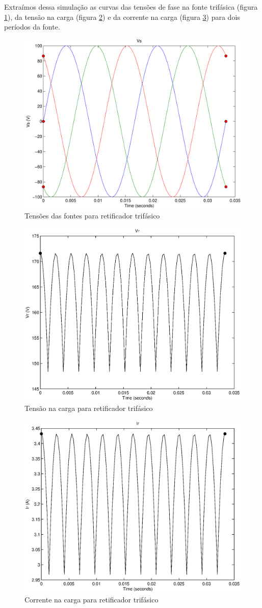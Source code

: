 \documentclass{report}
\begin{document}
{{Extraímos dessa simulação as curvas das tensões de fase na fonte trifásica (figura \ref{fig:tvs}), da tensão na carga (figura \ref{fig:tvr}) e da corrente na carga (figura \ref{fig:tir}) para dois períodos da fonte.
\begin{figure}[H]
	\centering
	\includegraphics[width=0.7\linewidth]{matlab/tri_vs}
	\caption{Tensões das fontes para retificador trifásico}
	\label{fig:tvs}
\end{figure}
\begin{figure}[H]
	\centering
	\includegraphics[width=0.7\linewidth]{matlab/tri_vr}
	\caption{Tensão na carga para retificador trifásico}
	\label{fig:tvr}
\end{figure}
\begin{figure}[H]
	\centering
	\includegraphics[width=0.7\linewidth]{matlab/tri_ir}
	\caption{Corrente na carga para retificador trifásico}
	\label{fig:tir}
\end{figure}

}}
\end{document}
